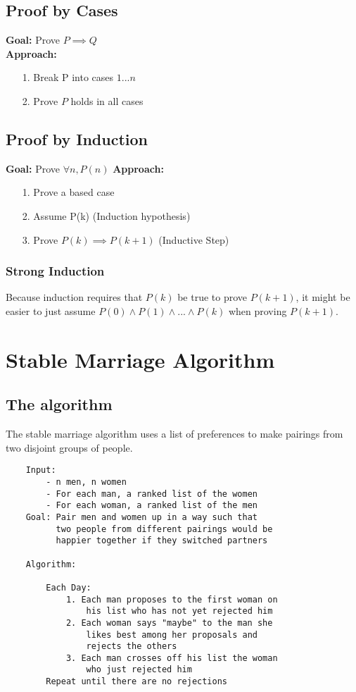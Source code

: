 \documentclass{article}
\begin{document}
\subsection{Proof by Cases}
\textbf{Goal: } Prove $P \implies Q$\\
\textbf{Approach: }
\begin{itemize}
    \item[1. ]Break P into cases $1...n$
    \item[2. ]Prove $P$ holds in all cases 
\end{itemize}
\subsection{Proof by Induction}
\textbf{Goal:} Prove $\forall n, P(n)$
\textbf{Approach: }
\begin{itemize}
    \item[1. ]Prove a based case
    \item[2. ]Assume P(k) (Induction hypothesis)
    \item[3. ]Prove $P(k) \implies P(k+1)$ (Inductive Step)
\end{itemize}
\subsubsection{Strong Induction}
Because induction requires that $P(k)$ be true to prove $P(k+1)$,
it might be easier to just assume $P(0)\land P(1) \land ... \land P(k)$ when proving $P(k+1)$.
\section{Stable Marriage Algorithm}
\subsection{The algorithm}
The stable marriage algorithm uses a list of preferences to make pairings from two disjoint groups of people.
\begin{lstlisting}
    Input: 
        - n men, n women
        - For each man, a ranked list of the women
        - For each woman, a ranked list of the men
    Goal: Pair men and women up in a way such that 
          two people from different pairings would be 
          happier together if they switched partners

    Algorithm:

        Each Day:
            1. Each man proposes to the first woman on 
                his list who has not yet rejected him
            2. Each woman says "maybe" to the man she 
                likes best among her proposals and 
                rejects the others
            3. Each man crosses off his list the woman 
                who just rejected him
        Repeat until there are no rejections
\end{lstlisting}
\end{document}
